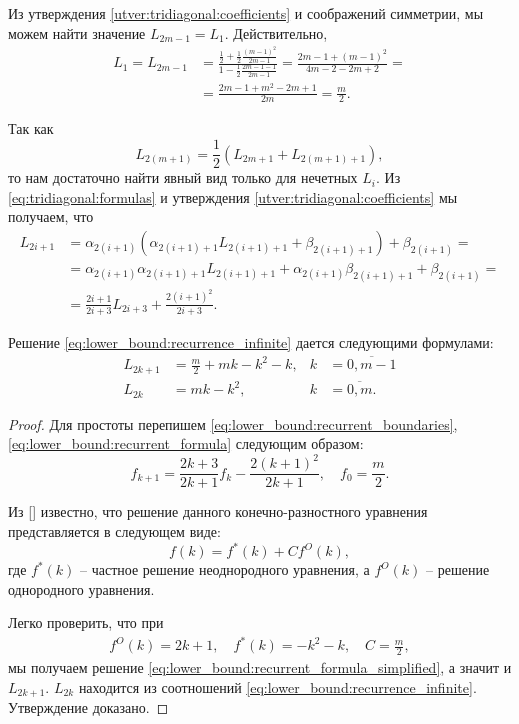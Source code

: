 Из утверждения \ref{utver:tridiagonal:coefficients} и соображений симметрии, мы можем найти значение $ L_{2m - 1} = L_1 $. Действительно,
\begin{align}
\label{eq:lower_bound:recurrent_boundaries}
L_1 = L_{2m-1} &= 
\frac{
    \frac{1}{2} + \frac{1}{2}\frac{(m-1)^2}{2m-1}
}{
    1 - \frac{1}{2}\frac{2m-1-1}{2m-1}
} =
\frac{
    2m - 1 + (m-1)^2
}{
    4m - 2 - 2m + 2
} = \nonumber \\
& = \frac{2m - 1 + m^2  - 2m + 1}{2m} = \frac{m}{2}.
\end{align}

Так как 
\[
L_{2(m + 1)} = \frac{1}{2} (L_{2m+1} + L_{2(m+1) + 1}),
\]
то нам достаточно найти явный вид только для нечетных $ L_i $. Из \eqref{eq:tridiagonal:formulas} и утверждения \ref{utver:tridiagonal:coefficients} мы получаем, что
\begin{align}
\label{eq:lower_bound:recurrent_formula}
L_{2i+1} &= \alpha_{2(i+1)}(
    \alpha_{2(i+1)+1} L_{2(i+1)+1} + \beta_{2(i+1)+1}
    ) + \beta_{2(i+1)} = \nonumber \\
&= \alpha_{2(i+1)}\alpha_{2(i+1)+1} L_{2(i+1)+1} +
    \alpha_{2(i+1)}\beta_{2(i+1)+1} + \beta_{2(i+1)} = \nonumber \\
&= \frac{2i+1}{2i+3} L_{2i+3} + \frac{2(i+1)^2}{2i+3}.
\end{align}

\begin{utver}
\label{utver:lower_bound:solution}
Решение \eqref{eq:lower_bound:recurrence_infinite} дается следующими формулами:
\begin{align*}
\label{eq:lower_bound:recurrence_solution}
    L_{2k+1} &= \frac{m}{2} + mk - k^2 - k,
  & 
    k &= \overline{0, m-1} \\
    L_{2k} &= mk - k^2, 
  & 
    k &= \overline{0, m}.
\end{align*}
\end{utver}
\begin{proof}
Для простоты перепишем \eqref{eq:lower_bound:recurrent_boundaries}, \eqref{eq:lower_bound:recurrent_formula} следующим образом:
\begin{equation}
\label{eq:lower_bound:recurrent_formula_simplified}
f_{k+1} = \frac{2k+3}{2k+1} f_k - \frac{2(k+1)^2}{2k+1}, \quad f_0 = \frac{m}{2}.
\end{equation}

Из [\gelfond] известно, что решение данного конечно-разностного уравнения представляется в следующем виде:
\[
f(k) = f^*(k) + Cf^O(k),
\]
где $ f^*(k) $ -- частное решение неоднородного уравнения, а $ f^O(k) $ -- решение однородного уравнения.

Легко проверить, что при
\[
\begin{array}{rcl}
  f^O(k) = 2k + 1, \quad
  f^*(k) = -k^2 - k, \quad
  C = \frac{m}{2},
\end{array}
\]
мы получаем решение \eqref{eq:lower_bound:recurrent_formula_simplified}, а значит и $ L_{2k+1} $. 
$ L_{2k} $ находится из соотношений \eqref{eq:lower_bound:recurrence_infinite}.
Утверждение доказано.
\end{proof}

